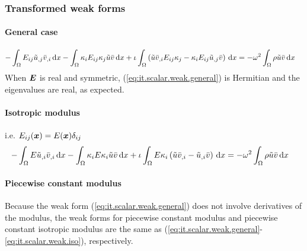 \subsubsection{Transformed weak forms} \label{it.scalar.weak}

\paragraph{General case}
%
\begin{align}
    - \int_{\Omega} {
        E_{ij} \tilde{u}_{,j} \bar{v}_{,i} \,\mathrm{d}x
    } - \int_{\Omega} {
        \kappa_{i} E_{ij} \kappa_{j} \tilde{u} \bar{v} \,\mathrm{d}x
    } + \iota \int_{\Omega} {
        \left(
            \tilde{u} \bar{v}_{,i} E_{ij} \kappa_{j}
            - \kappa_{i} E_{ij} \tilde{u}_{,j} \bar{v}
        \right) \,\mathrm{d}x
    } &=
    -\omega^2 \int_{\Omega} { \rho \tilde{u} \bar{v} \,\mathrm{d}x }
    \label{eq:it.scalar.weak.general}
\end{align}
%
When $\boldsymbol{E}$ is real and symmetric, (\ref{eq:it.scalar.weak.general}) is Hermitian and the eigenvalues are real, as expected.

\paragraph{Isotropic modulus} i.e. \(E_{ij}(\boldsymbol{x}) = E(\boldsymbol{x}) \delta_{ij}\)
%
\begin{align}
    - \int_{\Omega} {
        E \tilde{u}_{,i} \bar{v}_{,i} \,\mathrm{d}x
    } - \int_{\Omega} {
        \kappa_{i} E \kappa_{i} \tilde{u} \bar{v} \,\mathrm{d}x
    } + \iota \int_{\Omega} {
        E \kappa_{i} \left(
            \tilde{u} \bar{v}_{,i} - \tilde{u}_{,i} \bar{v}
        \right) \,\mathrm{d}x
    } &=
    -\omega^2 \int_{\Omega} { \rho \tilde{u} \bar{v} \,\mathrm{d}x }
    \label{eq:it.scalar.weak.iso}
\end{align}

\paragraph{Piecewise constant modulus} Because the weak form (\ref{eq:it.scalar.weak.general}) does not involve derivatives of the modulus, the weak forms for piecewise constant modulus and piecewise constant isotropic modulus are the same as (\ref{eq:it.scalar.weak.general}-\ref{eq:it.scalar.weak.iso}), respectively.
